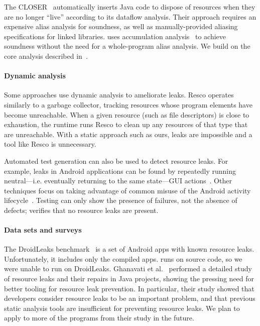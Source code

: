 The CLOSER~\cite{dillig2008closer} automatically inserts Java code to
dispose of resources when they are no longer ``live'' according to its
dataflow analysis.  Their approach requires an expensive alias
analysis for soundness, as well as manually-provided aliasing
specifications for linked libraries. \Tool uses
accumulation analysis~\cite{KelloggRSSE2020,FahndrichLeino03:IWACO} to
achieve soundness without the need for a whole-program alias analysis.
We build on the core analysis described in~\cite{KelloggRSSE2020}.

\paragraph{Dynamic analysis}
Some approaches use dynamic analysis to ameliorate leaks.  Resco \cite{dai2013resco}
operates similarly to a garbage collector, tracking resources whose program
elements have become unreachable. When a given resource (such as file
descriptors) is close to exhaustion, the runtime runs Resco to clean up any
resources of that type that are unreachable.  With a static approach such as
ours, leaks are impossible and a tool like Resco is unnecessary.

Automated test generation can also be used to detect resource
leaks. For example, leaks in Android applications can be found by
repeatedly running neutral---i.e. eventually returning to the same
state---GUI actions~\cite{wu2018sentinel,zhang2016automated}.
Other techniques focus on taking advantage of common misuse of
the Android activity lifecycle~\cite{amalfitano2020memories}.
Testing can only show the presence of failures, not the absence of defects;
\tool verifies that no resource leaks are present.

\paragraph{Data sets and surveys}
The DroidLeaks
benchmark~\cite{liu2019droidleaks} is a set of Android apps with known resource
leaks. Unfortunately, it includes only the compiled apps. \Tool runs on
source code, so we were unable to run \tool on DroidLeaks. Ghanavati et
al.~\cite{ghanavati2020memory} performed a detailed study of resource
leaks and their repairs in Java projects, showing the pressing need for better
tooling for resource leak prevention.  In particular, their study showed that
developers consider resource leaks to be an important problem, and that previous
static analysis tools are insufficient for preventing resource leaks.  We plan
to apply \tool to more of the programs from their study in the future.

